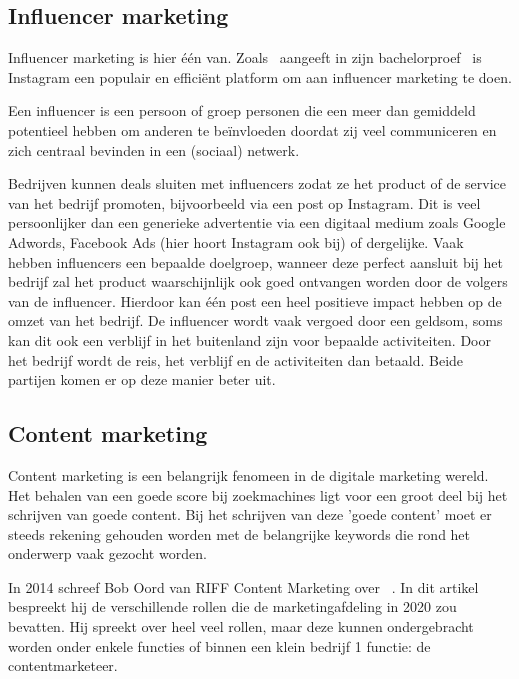 \subsection{Influencer marketing} \label{sec:influencer-marketing}
Influencer marketing is hier één van. Zoals~\textcite{Pieters2018} aangeeft in zijn bachelorproef~ is Instagram een populair en efficiënt platform om aan influencer marketing te doen. 

Een influencer is een persoon of groep personen die een meer dan gemiddeld potentieel hebben om anderen te beïnvloeden doordat zij veel communiceren en zich centraal bevinden in een (sociaal) netwerk.~\autocite{Pieters2018}

Bedrijven kunnen deals sluiten met influencers zodat ze het product of de service van het bedrijf promoten, bijvoorbeeld via een post op Instagram. Dit is veel persoonlijker dan een generieke advertentie via een digitaal medium zoals Google Adwords, Facebook Ads (hier hoort Instagram ook bij) of dergelijke. Vaak hebben influencers een bepaalde doelgroep, wanneer deze perfect aansluit bij het bedrijf zal het product waarschijnlijk ook goed ontvangen worden door de volgers van de influencer. Hierdoor kan één post een heel positieve impact hebben op de omzet van het bedrijf. De influencer wordt vaak vergoed door een geldsom, soms kan dit ook een verblijf in het buitenland zijn voor bepaalde activiteiten. Door het bedrijf wordt de reis, het verblijf en de activiteiten dan betaald. Beide partijen komen er op deze manier beter uit.


\subsection{Content marketing} \label{sec:content-marketing}
Content marketing is een belangrijk fenomeen in de digitale marketing wereld. Het behalen van een goede score bij zoekmachines ligt voor een groot deel bij het schrijven van goede content. Bij het schrijven van deze 'goede content' moet er steeds rekening gehouden worden met de belangrijke keywords die rond het onderwerp vaak gezocht worden. 

In 2014 schreef Bob Oord van RIFF Content Marketing over ~. In dit artikel bespreekt hij de verschillende rollen die de marketingafdeling in 2020 zou bevatten. Hij spreekt over heel veel rollen, maar deze kunnen ondergebracht worden onder enkele functies of binnen een klein bedrijf 1 functie: de contentmarketeer. 

